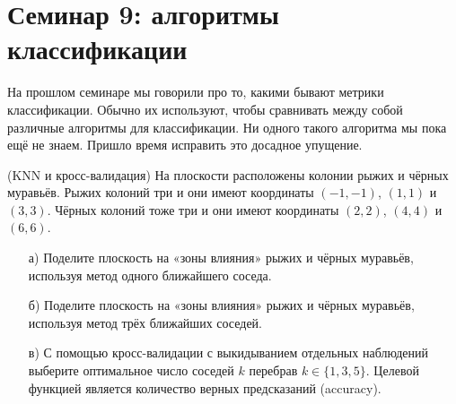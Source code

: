 \documentclass[12pt, a4paper, oneside]{article}
\theoremstyle{plain} %
\theoremstyle{definition}
\begin{document}

\toggletrue{lecture}


\section*{Семинар 9: алгоритмы классификации}

На прошлом семинаре мы говорили про то, какими бывают метрики классификации. Обычно их используют, чтобы сравнивать между собой различные алгоритмы для классификации. Ни одного такого алгоритма мы пока ещё не знаем. Пришло время исправить это досадное упущение. 

\begin{problem}{(KNN и кросс-валидация)}
На плоскости расположены колонии рыжих и чёрных муравьёв. Рыжих колоний три и они имеют координаты $(-1, -1)$, $(1, 1)$ и $(3, 3)$. Чёрных колоний тоже три и они имеют координаты $(2, 2)$, $(4, 4)$ и $(6, 6)$.

\begin{enumerate}
	\item[а)] Поделите плоскость на «зоны влияния» рыжих и чёрных муравьёв, используя метод одного ближайшего соседа.
	\item[б)] Поделите плоскость на «зоны влияния» рыжих и чёрных муравьёв, используя метод трёх ближайших соседей.
	\item[в)] С помощью кросс-валидации с выкидыванием отдельных наблюдений выберите оптимальное число соседей $k$ перебрав $k \in \{1, 3, 5\}$. Целевой функцией является количество верных предсказаний (accuracy).
\end{enumerate}
\end{problem}
\end{document}

